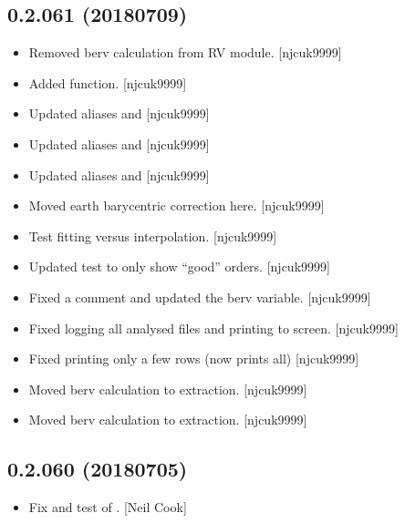 \documentclass[a4paper,10pt,english]{report}
\begin{document}
\subsection{0.2.061 (2018\sphinxhyphen{}07\sphinxhyphen{}09)}
\label{\detokenize{misc/changelog:id417}}\begin{itemize}
\item {} 
Removed berv calculation from RV module. {[}njcuk9999{]}

\item {} 
Added  function. {[}njcuk9999{]}

\item {} 
Updated aliases and  {[}njcuk9999{]}

\item {} 
Updated aliases and  {[}njcuk9999{]}

\item {} 
Updated aliases and  {[}njcuk9999{]}

\item {} 
Moved earth barycentric correction here. {[}njcuk9999{]}

\item {} 
Test fitting versus interpolation. {[}njcuk9999{]}

\item {} 
Updated test to only show “good” orders. {[}njcuk9999{]}

\item {} 
Fixed a comment and updated the berv variable. {[}njcuk9999{]}

\item {} 
Fixed logging all analysed files and printing to screen. {[}njcuk9999{]}

\item {} 
Fixed  printing only a few rows (now prints all)
{[}njcuk9999{]}

\item {} 
Moved berv calculation to extraction. {[}njcuk9999{]}

\item {} 
Moved berv calculation to extraction. {[}njcuk9999{]}

\end{itemize}


\subsection{0.2.060 (2018\sphinxhyphen{}07\sphinxhyphen{}05)}
\label{\detokenize{misc/changelog:id418}}\begin{itemize}
\item {} 
Fix and test of . {[}Neil Cook{]}

\end{itemize}
\end{document}
